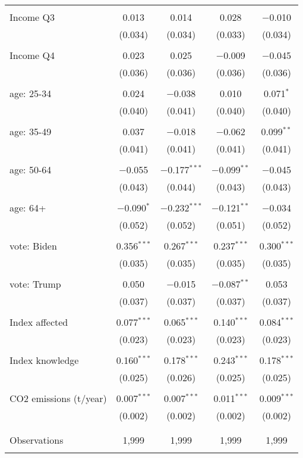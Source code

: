 \begin{tabular}{@{\extracolsep{5pt}}lcccc}
  & & & & \\ 
 Income Q3 & 0.013 & 0.014 & 0.028 & $-$0.010 \\ 
  & (0.034) & (0.034) & (0.033) & (0.034) \\ 
  & & & & \\ 
 Income Q4 & 0.023 & 0.025 & $-$0.009 & $-$0.045 \\ 
  & (0.036) & (0.036) & (0.036) & (0.036) \\ 
  & & & & \\ 
 age: 25-34 & 0.024 & $-$0.038 & 0.010 & 0.071$^{*}$ \\ 
  & (0.040) & (0.041) & (0.040) & (0.040) \\ 
  & & & & \\ 
 age: 35-49 & 0.037 & $-$0.018 & $-$0.062 & 0.099$^{**}$ \\ 
  & (0.041) & (0.041) & (0.041) & (0.041) \\ 
  & & & & \\ 
 age: 50-64 & $-$0.055 & $-$0.177$^{***}$ & $-$0.099$^{**}$ & $-$0.045 \\ 
  & (0.043) & (0.044) & (0.043) & (0.043) \\ 
  & & & & \\ 
 age: 64+ & $-$0.090$^{*}$ & $-$0.232$^{***}$ & $-$0.121$^{**}$ & $-$0.034 \\ 
  & (0.052) & (0.052) & (0.051) & (0.052) \\ 
  & & & & \\ 
 vote: Biden & 0.356$^{***}$ & 0.267$^{***}$ & 0.237$^{***}$ & 0.300$^{***}$ \\ 
  & (0.035) & (0.035) & (0.035) & (0.035) \\ 
  & & & & \\ 
 vote: Trump & 0.050 & $-$0.015 & $-$0.087$^{**}$ & 0.053 \\ 
  & (0.037) & (0.037) & (0.037) & (0.037) \\ 
  & & & & \\ 
 Index affected & 0.077$^{***}$ & 0.065$^{***}$ & 0.140$^{***}$ & 0.084$^{***}$ \\ 
  & (0.023) & (0.023) & (0.023) & (0.023) \\ 
  & & & & \\ 
 Index knowledge & 0.160$^{***}$ & 0.178$^{***}$ & 0.243$^{***}$ & 0.178$^{***}$ \\ 
  & (0.025) & (0.026) & (0.025) & (0.025) \\ 
  & & & & \\ 
 CO2 emissions (t/year) & 0.007$^{***}$ & 0.007$^{***}$ & 0.011$^{***}$ & 0.009$^{***}$ \\ 
  & (0.002) & (0.002) & (0.002) & (0.002) \\ 
  & & & & \\ 
\hline \\[-1.8ex] 

Observations & 1,999 & 1,999 & 1,999 & 1,999 \\ 
\hline 
\hline \\[-1.8ex] 
\end{tabular} 